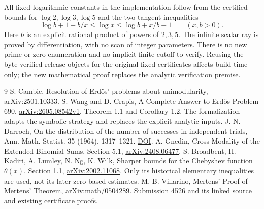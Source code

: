\documentclass[11pt]{article}
\begin{document}
All fixed logarithmic constants in the implementation follow from the
certified bounds for $\log2,\log3,\log5$ and the two tangent inequalities
\[
 \log b+1-b/x\le\log x\le\log b+x/b-1\qquad(x,b>0).
\]
Here $b$ is an explicit rational product of powers of $2,3,5$.
The infinite scalar ray is proved by differentiation, with no scan of
integer parameters. There is no new prime or zero enumeration and no
implicit finite cutoff to verify. Reusing the byte-verified release objects
for the original fixed certificates affects build time only; the new
mathematical proof replaces the analytic verification premise.

\begin{thebibliography}{9}
 S. Cambie, Resolution of Erd\H{o}s' problems about
unimodularity, \href{https://arxiv.org/abs/2501.10333}{arXiv:2501.10333}.
 S. Wang and D. Crapis, A Complete Answer to Erd\H{o}s
Problem 690, \href{https://arxiv.org/abs/2605.08542v1}{arXiv:2605.08542v1},
Theorem 1.1 and Corollary 1.2. The formalization adapts the symbolic strategy
and replaces the explicit analytic inputs.
 J. N. Darroch, On the distribution of the number of successes
in independent trials, Ann. Math. Statist. 35 (1964), 1317--1321.
\href{https://doi.org/10.1214/aoms/1177703287}{DOI}.
 A. Gnedin, Cross Modality of the Extended Binomial Sums,
Section 5.1, \href{https://arxiv.org/abs/2408.06477}{arXiv:2408.06477}.
 S. Broadbent, H. Kadiri, A. Lumley, N. Ng, K. Wilk,
Sharper bounds for the Chebyshev function $\theta(x)$, Section 1.1,
\href{https://arxiv.org/abs/2002.11068}{arXiv:2002.11068}.
Only its historical elementary inequalities are used, not its later
zero-based estimates.
 M. B. Villarino, Mertens' Proof of Mertens' Theorem,
\href{https://arxiv.org/abs/math/0504289}{arXiv:math/0504289}.
\href{https://github.com/TheJustinSunPrize/awards/pull/4526}{Submission 4526}
and its linked source and existing certificate proofs.
\end{thebibliography}
\end{document}
